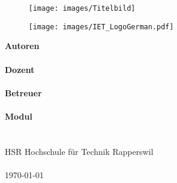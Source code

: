 \begin{titlepage}
	
	\begin{adjustwidth}{-25mm}{-45mm}
		\begin{adjustwidth}{35mm}{10mm}
				\textrm{	%
				\vspace*{2cm}
				\begin{flushleft}
					\Huge \textbf{\Title}\\
					\vspace{.25cm}
					\Large \TitleInfo \\  %
				\end{flushleft}
			}
		\end{adjustwidth}
	
		\begin{figure}[ht]
			\centering
			\texttt{[image: images/Titelbild]}
		\end{figure}
	
		\begin{figure}[ht]
			\centering
			\texttt{[image: images/IET\_LogoGerman.pdf]}
		\end{figure}

	
			\begin{adjustwidth}{35mm}{40mm}	
			\vfill
			\large
			\textrm{\textbf{Autoren}}\\
			\textrm{\Author} \\
			\textrm{\textbf{Dozent}}\\
			\textrm{\Prof}\\
			\textrm{\textbf{Betreuer}}\\
			\textrm{\Betreuer}\\
			\textrm{\textbf{Modul}}\\
			\textrm{\Modul}\\
			\hfill\hbox{}\\
			\textrm{HSR Hochschule für Technik Rapperswil}\\
			\hfill\hbox{}\\
			\textrm{\today}
            \vspace{1cm}
		\end{adjustwidth}	
	
	\end{adjustwidth}
\end{titlepage}
